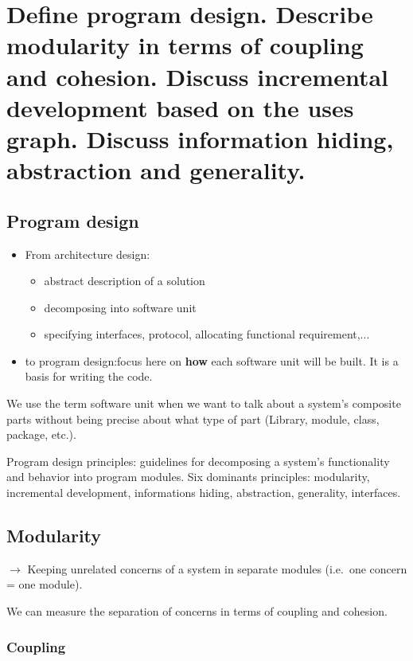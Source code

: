 \clearpage{}

\section{Define program design. Describe modularity in terms of coupling
and cohesion. Discuss incremental development based on the uses graph.
Discuss information hiding, abstraction and generality.}

\subsection{Program design}

\begin{itemize}
    \item From architecture design:
        \begin{itemize} 
            \item abstract description of a solution
            \item decomposing into software unit 
            \item specifying interfaces, protocol, allocating
                functional requirement,...
        \end{itemize}
    \item to program design:focus here on \textbf{how} each software unit will be built. It is a basis for writing the code. 
\end{itemize}

We use the term software unit when we want to talk about a system’s composite parts
without being precise about what type of part (Library, module, class, package, etc.).
\newline

Program design principles: guidelines for decomposing a system's
functionality and behavior into program modules. Six dominants
principles: modularity, incremental
development, informations hiding, abstraction, generality, interfaces.

\subsection{Modularity}

$\rightarrow$ Keeping unrelated concerns of a system in separate modules (i.e.\ one concern = one
module).

We can measure the separation of concerns in terms of coupling and cohesion.

\subsubsection{Coupling}

